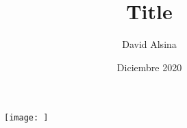 \documentclass[a4paper,12pt]{article}
\title{Title}
\author{David Alsina}
\date{Diciembre 2020}
\begin{document}
    \begin{figure}[ht]
		\centering
		\texttt{[image: ]}
		\maketitle
    \end{figure}
\end{document}
